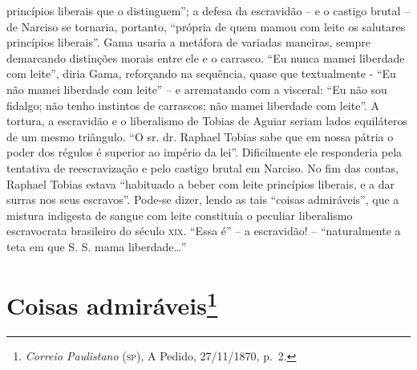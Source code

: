 \begin{argumento}
{princípios liberais que o distinguem''; a defesa da escravidão -- e o
castigo brutal -- de Narciso se tornaria, portanto, ``própria de quem
mamou com leite os salutares princípios liberais''. Gama usaria a
metáfora de variadas maneiras, sempre demarcando distinções morais entre
ele e o carrasco. ``Eu nunca mamei liberdade com leite'', diria Gama,
reforçando na sequência, quase que textualmente - ``Eu não mamei
liberdade com leite'' -- e arrematando com a visceral: ``Eu não sou
fidalgo; não tenho instintos de carrascos; não mamei liberdade com
leite''. A tortura, a escravidão e o liberalismo de Tobias de Aguiar
seriam lados equiláteros de um mesmo triângulo. ``O sr. dr. Raphael
Tobias sabe que em nossa pátria o poder dos régulos é superior ao
império da lei''. Dificilmente ele responderia pela tentativa de
reescravização e pelo castigo brutal em Narciso. No fim das contas,
Raphael Tobias estava ``habituado a beber com leite princípios liberais,
e a dar surras nos seus escravos''. Pode-se dizer, lendo as tais ``coisas
admiráveis'', que a mistura indigesta de sangue com leite constituía o
peculiar liberalismo escravocrata brasileiro do século \textsc{xix}. ``Essa é'' --
a escravidão! -- ``naturalmente a teta em que S. S. mama liberdade\ldots{}''}
\end{argumento}

\chapter{Coisas admiráveis\footnote{\emph{Correio Paulistano} (\textsc{sp}), A Pedido, 27/11/1870,
  p.~2.}} %

